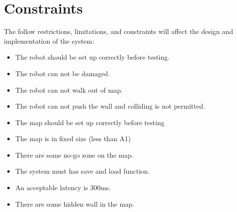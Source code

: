 \documentclass[11pt, a4paper]{report}
\begin{document}
\section{Constraints}
The follow restrictions, limitations, and constraints will affect the design and implementation of the system:
\begin{itemize}
  \item The robot should be set up correctly before testing.
  \item The robot can not be damaged.
  \item The robot can not walk out of map.
  \item The robot can not push the wall and colliding is not permitted.
  \item The map should be set up correctly before testing
  \item The map is in fixed size (less than A1)
  \item There are some no-go zone on the map.
  \item The system must has save and load function.
  \item An acceptable latency is 300ms.
  \item There are some hidden wall in the map.
\end{itemize}


\pagebreak
\end{document}
